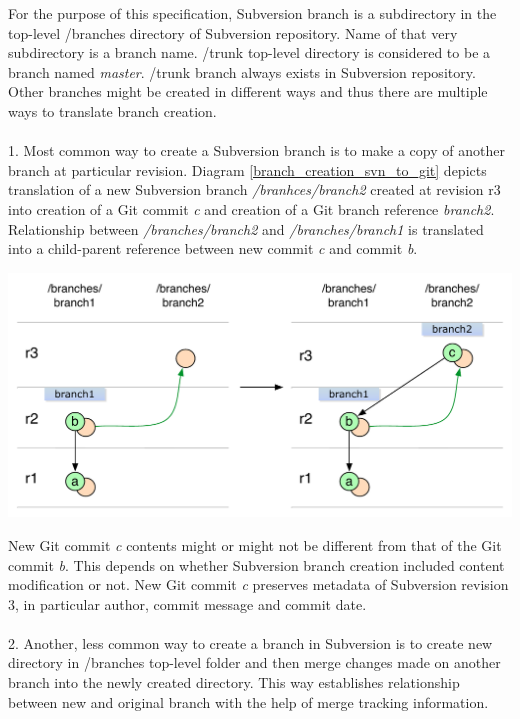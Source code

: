 For the purpose of this specification, Subversion branch is a subdirectory in the top-level /branches directory of
Subversion repository. Name of that very subdirectory is a branch name. /trunk top-level directory is considered to be a branch named \emph{master}.
/trunk branch always exists in Subversion repository. Other branches might be created in different ways and thus there are 
multiple ways to translate branch creation.
\\\\
1. Most common way to create a Subversion branch is to make a copy of another branch at particular revision.
Diagram \ref{branch_creation_svn_to_git} depicts translation of a new Subversion branch \emph{/branhces/branch2} created 
at revision r3 into creation of a Git commit \emph{c} and creation of a Git branch reference \emph{branch2}. Relationship 
between \emph{/branches/branch2} and \emph{/branches/branch1} is translated into a child-parent reference between new commit \emph{c} and commit \emph{b}.
\begin{center}
\includegraphics[width=\textwidth]{img/diagrams/branch_creation_svn_to_git.pdf}%
\label{branch_creation_svn_to_git}%
\end{center}
New Git commit \emph{c} contents might or might not be different from that of the Git commit \emph{b}. 
This depends on whether Subversion branch creation included content modification or not. New Git commit
\emph{c} preserves metadata of Subversion revision 3, in particular author, commit message and commit date.
\\\\
2. Another, less common way to create a branch in Subversion is to create new directory in /branches top-level
folder and then merge changes made on another branch into the newly created directory. This way
establishes relationship between new and original branch with the help of merge tracking information.

